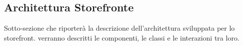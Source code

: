 \subsection{Architettura Storefronte}

Sotto-sezione che riporterà la descrizione dell'architettura sviluppata per lo storefront.
verranno descritti le componenti, le classi e le interazioni tra loro.
